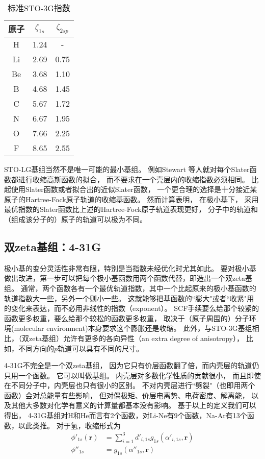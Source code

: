 \begin{table}[h]
	\centering\caption{标准STO-3G指数}
	\begin{tabular}{ccc}
		\hline
		原子&$\zeta_{1s}$&$\zeta_{2sp}$\\\hline
		H	 &1.24&-\\
		Li	 &2.69&0.75\\		
		Be	 &3.68&1.10\\
		B	 &4.68&1.45\\
		C	 &5.67&1.72\\
		N	 &6.67&1.95\\		
		O	 &7.66&2.25\\
		F	 &8.65&2.55\\
		\hline
	\end{tabular}
	\label{t3.8}
\end{table}

STO-LG基组当然不是唯一可能的最小基组。
例如Stewart\endnote{
}
等人就对每个Slater函数都进行收缩高斯函数的拟合，
而不要求在一个壳层内的收缩指数必须相同。
比起使用Slater函数或者拟合出的近似Slater函数，
一个更合理的选择是十分接近某原子的Hartree-Fock原子轨道的收缩基函数。
然而计算表明，
在极小基下，
采用最优指数的Slater函数比上述的Hartree-Fock原子轨道表现更好，
分子中的轨道和（组成该分子的）原子的轨道可以极为不同。

\subsection{双zeta基组：4-31G}
极小基的变分灵活性非常有限，特别是当指数未经优化时尤其如此。
要对极小基做出改进，第一步可以把每个极小基函数用两个函数代替，即造出一个双zeta基组。
通常，两个函数各有一个最优轨道指数，其中一个比起原来的极小基函数的轨道指数大一些，另外一个则小一些。
这就能够把基函数的``膨大"或者``收紧"用的变化来表达，而不必用非线性的指数（exponent）。
SCF手续要么给那个较紧的函数更多权重，要么给那个较松的函数更多权重，
取决于（原子周围的）分子环境(molecular environment)本身要求这个膨胀还是收缩。
此外，与STO-3G基组相比，（双zeta基组）允许有更多的各向异性（an extra degree of anisotropy），
比如，不同方向的$p$轨道可以具有不同的尺寸。

4-31G不完全是一个双zeta基组，
因为它只有价层函数翻了倍，而内壳层的轨道仍只用一个函数。
它可以叫做基组。
内壳层对多数化学性质的贡献很小，
而且即使在不同分子中，内壳层也只有很小的区别。
不对内壳层进行``劈裂"（也即用两个函数）会对总能量有些影响，
但对偶极矩、价层电离势、电荷密度、解离能，
以及其他大多数对化学有意义的计算量都基本没有影响。
基于以上的定义我们可以得出，
4-31G基组对H和He而言有2个函数，对Li-Ne有9个函数，Na-Ar有13个函数，以此类推。
对于氢，收缩形式为
\begin{align}
    \phi'_{1s}(\mathbf{r}) & = \sum_{i=1}^3 d'_{i,1s}g_{1s}(\alpha'_{i,1s}, \mathbf{r})
    \\
    \phi''_{1s} & = g_{1s}(\alpha''_{1s},\mathbf{r}) 
\end{align}

